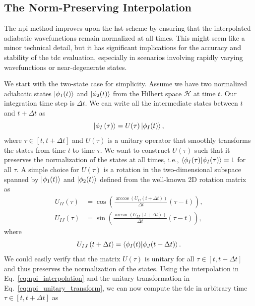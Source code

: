 \subsection{The Norm-Preserving Interpolation}\label{sec:norm_preserving_interpolation}
The \gls{npi} method improves upon the \gls{hst} scheme by ensuring that the interpolated adiabatic wavefunctions remain normalized at all times.\supercite{10.1021/jz5009449,10.1021/acs.jctc.6b00673} This might seem like a minor technical detail, but it has significant implications for the accuracy and stability of the \gls{tdc} evaluation, especially in scenarios involving rapidly varying wavefunctions or near-degenerate states.

We start with the two-state case for simplicity. Assume we have two normalized adiabatic states $\ket{\phi_1(t)}$ and $\ket{\phi_2(t)}$ from the Hilbert space $\mathcal{H}$ at time $t$. Our integration time step is $\Delta t$. We can write all the intermediate states between $t$ and $t+\Delta t$ as
\begin{equation}\label{eq:npi_interpolation}
\ket{\phi_I\left(\tau\right)}=U(\tau)\ket{\phi_I(t)},
\end{equation}
where $\tau\in[t,t+\Delta t]$ and $U(\tau)$ is a unitary operator that smoothly transforms the states from time $t$ to time $\tau$. We want to construct $U(\tau)$ such that it preserves the normalization of the states at all times, i.e., $\Braket{\phi_I(\tau)\vert\phi_I(\tau)}=1$ for all $\tau$. A simple choice for $U(\tau)$ is a rotation in the two-dimensional subspace spanned by $\ket{\phi_1(t)}$ and $\ket{\phi_2(t)}$ defined from the well-known 2D rotation matrix as
\begin{align}\label{eq:npi_unitary_transform}
U_{II}(\tau)&=\cos\left(\frac{\arccos\left(U_{II}\left(t+\Delta t\right)\right)}{\Delta t}\left(\tau-t\right)\right),\\
U_{IJ}(\tau)&=\sin\left(\frac{\arcsin\left(U_{IJ}\left(t+\Delta t\right)\right)}{\Delta t}\left(\tau-t\right)\right),
\end{align}
where
\begin{equation}\label{eq:npi_unitary_matrix}
U_{IJ}\left(t+\Delta t\right)=\Braket{\phi_I(t)\vert\phi_J(t+\Delta t)}.
\end{equation}
We could easily verify that the matrix $U(\tau)$ is unitary for all $\tau\in[t,t+\Delta t]$ and thus preserves the normalization of the states.
Using the interpolation in Eq.~\eqref{eq:npi_interpolation} and the unitary transformation in Eq.~\eqref{eq:npi_unitary_transform}, we can now compute the \gls{tdc} in arbitrary time $\tau\in[t,t+\Delta t]$ as
